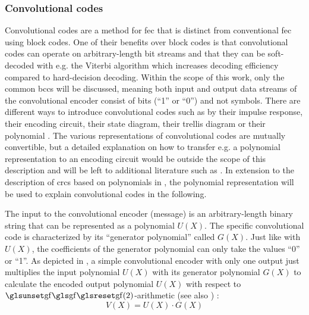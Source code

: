 \subsubsection{Convolutional codes}
Convolutional codes are a method for \gls{fec} that is distinct from conventional \gls{fec} using block codes.
One of their benefits over block codes is that convolutional codes can operate on arbitrary-length bit streams and that they can be soft-decoded with e.g. the Viterbi algorithm which increases decoding efficiency compared to hard-decision decoding.
Within the scope of this work, only the common \glspl{bcc} will be discussed, meaning both input and output data streams of the convolutional encoder consist of bits (``1'' or ``0'') and not symbols.
There are different ways to introduce convolutional codes such as by their impulse response, their encoding circuit, their state diagram, their trellis diagram or their polynomial \cite[chapter 8]{ecctechniques}.
The various representations of convolutional codes are mutually convertible, but a detailed explanation on how to transfer e.g. a polynomial representation to an encoding circuit would be outside the scope of this description and will be left to additional literature such as \cite[chapter 8]{ecctechniques}.
In extension to the description of \glspl{crc} based on polynomials in , the polynomial representation will be used to explain convolutional codes in the following.

The input to the convolutional encoder (message) is an arbitrary-length binary string that can be represented as a polynomial $U(X)$.
The specific convolutional code is characterized by its ``generator polynomial'' called $G(X)$.
Just like with $U(X)$, the coefficients of the generator polynomial can only take the values ``0'' or ``1''.
As depicted in , a simple convolutional encoder with only one output just multiplies the input polynomial $U(X)$ with its generator polynomial $G(X)$ to calculate the encoded output polynomial $U(X)$ with respect to $\GF(2)$-arithmetic (see also ) \cite[Equation (8.1)]{ecctechniques}:
\begin{equation}
	V(X) = U(X) \cdot G(X)
	\label{eq:convcode_basic}
\end{equation}

